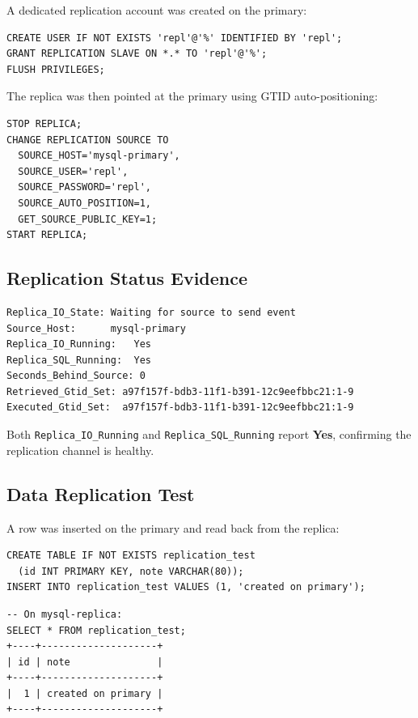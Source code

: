 \documentclass[12pt,a4paper]{article}
\begin{document}
A dedicated replication account was created on the primary:

\begin{lstlisting}[style=sqlstyle, caption={Creating the replication user.}]
CREATE USER IF NOT EXISTS 'repl'@'%' IDENTIFIED BY 'repl';
GRANT REPLICATION SLAVE ON *.* TO 'repl'@'%';
FLUSH PRIVILEGES;
\end{lstlisting}

The replica was then pointed at the primary using GTID auto-positioning:

\begin{lstlisting}[style=sqlstyle, caption={Replica configuration.}]
STOP REPLICA;
CHANGE REPLICATION SOURCE TO
  SOURCE_HOST='mysql-primary',
  SOURCE_USER='repl',
  SOURCE_PASSWORD='repl',
  SOURCE_AUTO_POSITION=1,
  GET_SOURCE_PUBLIC_KEY=1;
START REPLICA;
\end{lstlisting}

\subsection{Replication Status Evidence}

\begin{lstlisting}[style=bashstyle, caption={SHOW REPLICA STATUS output (relevant fields).}]
Replica_IO_State: Waiting for source to send event
Source_Host:      mysql-primary
Replica_IO_Running:   Yes
Replica_SQL_Running:  Yes
Seconds_Behind_Source: 0
Retrieved_Gtid_Set: a97f157f-bdb3-11f1-b391-12c9eefbbc21:1-9
Executed_Gtid_Set:  a97f157f-bdb3-11f1-b391-12c9eefbbc21:1-9
\end{lstlisting}

Both \texttt{Replica\_IO\_Running} and \texttt{Replica\_SQL\_Running} report
\textbf{Yes}, confirming the replication channel is healthy.

\subsection{Data Replication Test}

A row was inserted on the primary and read back from the replica:

\begin{lstlisting}[style=sqlstyle, caption={Insert on primary.}]
CREATE TABLE IF NOT EXISTS replication_test
  (id INT PRIMARY KEY, note VARCHAR(80));
INSERT INTO replication_test VALUES (1, 'created on primary');
\end{lstlisting}

\begin{lstlisting}[style=bashstyle, caption={Query on replica -- row successfully replicated.}]
-- On mysql-replica:
SELECT * FROM replication_test;
+----+--------------------+
| id | note               |
+----+--------------------+
|  1 | created on primary |
+----+--------------------+
\end{lstlisting}
\end{document}
